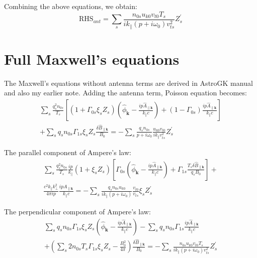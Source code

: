 \documentclass[12pt]{article}
\begin{document}
Combining the above equations, we obtain:
\begin{equation}
\mathrm{RHS}_{ant} = \sum_s \frac{n_{0s} u_{k0} v_{t0} T_s}{ik_\parallel (p + i\omega_0) v_{ts}^2} Z^\prime_s
\end{equation}

\section{Full Maxwell's equations}
The Maxwell's equations without antenna terms are derived in AstroGK manual and also my earlier note. Adding the antenna term, Poisson equation becomes:
\begin{equation}
\begin{split}
\sum_s \frac{q_s^2 n_{0s}}{T_s} \left[(1+\Gamma_{0s}\xi_s Z_s)\left(\hat{\phi}_\mathbf{k} - \frac{ip\hat{A}_{\parallel\mathbf{k}}}{k_\parallel c}\right) + (1 - \Gamma_{0s}) \frac{ip\hat{A}_{\parallel \mathbf{k}}}{k_\parallel c}\right] \\
+ \sum_s q_s n_{0s} \Gamma_{1s} \xi_s Z_s \frac{\delta \hat{B}_{\parallel\mathbf{k}}}{B_0} = -\sum_s \frac{q_s n_{0s}}{p + i\omega_0}\frac{u_{k0} v_{t0}}{ik_\parallel v_{ts}^2} Z^\prime_s
\end{split}
\label{eq:poisson_eq_2}
\end{equation}

The parallel component of Ampere's law: 
\begin{equation}
\begin{split}
\sum_s \frac{q_s^2n_{0s}}{T_s} \frac{ip}{k_\parallel}(1+\xi_s Z_s) \left[\Gamma_{0s}\left(\hat{\phi}_\mathbf{k} - \frac{ip\hat{A}_{\parallel\mathbf{k}}}{k_\parallel c}\right) + \Gamma_{1s} \frac{T_s\delta \hat{B}_{\parallel\mathbf{k}}}{q_sB_0}\right] + \\
\frac{c^2k_\parallel k_\perp^2}{4\pi ip} \frac{ipA_{\parallel\mathbf{k}}}{k_\parallel c}=  -\sum_s  \frac{q_s n_{0s} u_{k0}}{ik_\parallel(p + i\omega_0)} \frac{v_{t0}}{v_{ts}} \xi_s Z^\prime_s
\end{split}
\label{eq:par_ampere_eq_2}
\end{equation}

The perpendicular component of Ampere's law:
\begin{equation}
\begin{split}
\sum_s q_s n_{0s} \Gamma_{1s} \xi_s Z_s \left(\hat{\phi}_\mathbf{k} - \frac{ip\hat{A}_{\parallel\mathbf{k}}}{k_\parallel c}\right) - \sum_s q_s n_{0s} \Gamma_{1s} \frac{ip\hat{A}_{\parallel\mathbf{k}}}{k_\parallel c}  \\
+ \left(\sum_s 2n_{0s} T_s \Gamma_{1s} \xi_s Z_s - \frac{B_0^2}{4\pi}\right) \frac{\delta \hat{B}_{\parallel\mathbf{k}}}{B_0} = - \sum_s \frac{n_{0s} u_{k0} v_{t0} T_s}{ik_\parallel (p + i\omega_0) v_{ts}^2} Z^\prime_s
\end{split}
\label{eq:perp_ampere_eq_2}
\end{equation}
\end{document}
